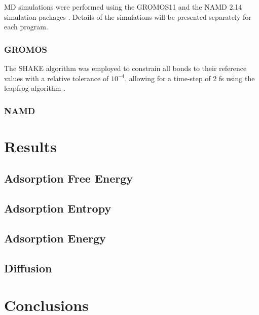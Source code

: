 \documentclass[twoside,twocolumn,9pt]{article}
\begin{document}
MD simulations were performed using the GROMOS11 \cite{Riniker_2011,
  Schmid_2012} and the NAMD 2.14 simulation packages
\cite{Phillips_2020}.
Details of the simulations will be presented separately for each program.

\subsubsection{GROMOS}

The SHAKE algorithm \cite{Ryckaert_1977} was employed to constrain all
bonds to their reference values with a relative tolerance of
$10^{-4}$, allowing for a time-step of 2 fs using the leapfrog
algorithm \cite{Hockney_1977}.
\subsubsection{NAMD}





\section{Results}

\subsection{Adsorption Free Energy}

\subsection{Adsorption Entropy}

\subsection{Adsorption Energy}

\subsection{Diffusion}

\section{Conclusions}
\end{document}
